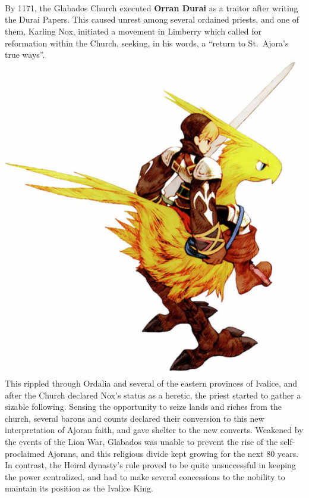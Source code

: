 \vfill
{}\\\\
%
\\
By 1171, the Glabados Church executed \textbf{Orran Durai} as a traitor after writing the Durai Papers. 
This caused unrest among several ordained priests, and one of them, Karling Nox, initiated a movement in Limberry which called for reformation within the Church, seeking, in his words, a “return to St.~Ajora’s true ways”. 
%
\pagebreak\\
\includegraphics[width=\columnwidth]{./art/images/chocoborider.jpg}
\vfill
%
This rippled through Ordalia and several of the eastern provinces of Ivalice, and after the Church declared Nox’s status as a heretic, the priest started to gather a sizable following. 
Sensing the opportunity to seize lands and riches from the church, several barons and counts declared their conversion to this new interpretation of Ajoran faith, and gave shelter to the new converts.
Weakened by the events of the Lion War, Glabados was unable to prevent the rise of the self-proclaimed Ajorans, and this religious divide kept growing for the next 80 years. In contrast, the Heiral dynasty's rule proved to be quite unsuccessful in keeping the power centralized, and had to make several concessions to the nobility to maintain its position as the Ivalice King.
